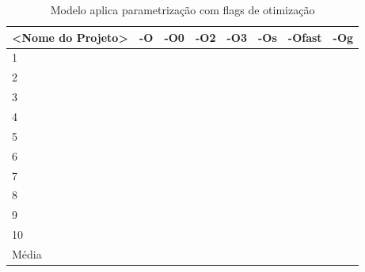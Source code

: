 \begin{table}[!ht]
\centering
\tiny
\caption{Modelo aplica parametrização com flags de otimização}
\label{tab:modelo_otimizacao_compilacao}
\begin{tabular}{llllllll}
\textbf{<Nome do Projeto>} & \textbf{-O} & \textbf{-O0} & \textbf{-O2} & \textbf{-O3} & \textbf{-Os} & \textbf{-Ofast} & \textbf{-Og} \\ \toprule
1                          &             &              &              &              &              &                 &        \\ 
2                          &             &              &              &              &              &                 &        \\ 
3                          &             &              &              &              &              &                 &        \\ 
4                          &             &              &              &              &              &                 &        \\ 
5                          &             &              &              &              &              &                 &        \\ 
6                          &             &              &              &              &              &                 &        \\ 
7                          &             &              &              &              &              &                 &        \\ 
8                          &             &              &              &              &              &                 &        \\ 
9                          &             &              &              &              &              &                 &        \\ 
10                         &             &              &              &              &              &                 &        \\ \bottomrule
Média                      &             &              &              &              &              &                 &        \\ 
\end{tabular}
\end{table}

